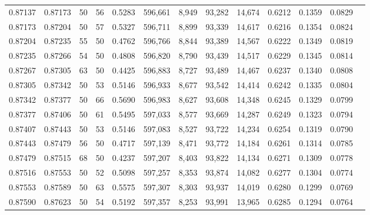 \begin{tabular}{rrrrrrrrrrrrr}
0.87137 & 0.87173 &    50 &  56 &                                     0.5283 & 596,661 &   8,949 &  93,282 &  14,674 & 0.6212 & 0.1359 & 0.0829 \\
0.87173 & 0.87204 &    50 &  57 &                                     0.5327 & 596,711 &   8,899 &  93,339 &  14,617 & 0.6216 & 0.1354 & 0.0824 \\
0.87204 & 0.87235 &    55 &  50 &                                     0.4762 & 596,766 &   8,844 &  93,389 &  14,567 & 0.6222 & 0.1349 & 0.0819 \\
0.87235 & 0.87266 &    54 &  50 &                                     0.4808 & 596,820 &   8,790 &  93,439 &  14,517 & 0.6229 & 0.1345 & 0.0814 \\
0.87267 & 0.87305 &    63 &  50 &                                     0.4425 & 596,883 &   8,727 &  93,489 &  14,467 & 0.6237 & 0.1340 & 0.0808 \\
0.87305 & 0.87342 &    50 &  53 &                                     0.5146 & 596,933 &   8,677 &  93,542 &  14,414 & 0.6242 & 0.1335 & 0.0804 \\
0.87342 & 0.87377 &    50 &  66 &                                     0.5690 & 596,983 &   8,627 &  93,608 &  14,348 & 0.6245 & 0.1329 & 0.0799 \\
0.87377 & 0.87406 &    50 &  61 &                                     0.5495 & 597,033 &   8,577 &  93,669 &  14,287 & 0.6249 & 0.1323 & 0.0794 \\
0.87407 & 0.87443 &    50 &  53 &                                     0.5146 & 597,083 &   8,527 &  93,722 &  14,234 & 0.6254 & 0.1319 & 0.0790 \\
0.87443 & 0.87479 &    56 &  50 &                                     0.4717 & 597,139 &   8,471 &  93,772 &  14,184 & 0.6261 & 0.1314 & 0.0785 \\
0.87479 & 0.87515 &    68 &  50 &                                     0.4237 & 597,207 &   8,403 &  93,822 &  14,134 & 0.6271 & 0.1309 & 0.0778 \\
0.87516 & 0.87553 &    50 &  52 &                                     0.5098 & 597,257 &   8,353 &  93,874 &  14,082 & 0.6277 & 0.1304 & 0.0774 \\
0.87553 & 0.87589 &    50 &  63 &                                     0.5575 & 597,307 &   8,303 &  93,937 &  14,019 & 0.6280 & 0.1299 & 0.0769 \\
0.87590 & 0.87623 &    50 &  54 &                                     0.5192 & 597,357 &   8,253 &  93,991 &  13,965 & 0.6285 & 0.1294 & 0.0764 \\

\end{tabular}
